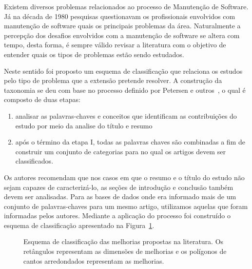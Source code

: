 Existem diversos problemas relacionados ao processo de Manutenção de Software.
Já na década de 1980 pesquisas questionavam os profissionais envolvidos com
manutenção de software quais os principais problemas da
área\cite{Lientz:1981:PAS:358790.358796}. Naturalmente a percepção dos desafios
envolvidos com a manutenção de software se altera com tempo, desta forma, é
sempre válido revisar a literatura com o objetivo de entender quais os tipos de
problemas estão sendo estudados.

Neste sentido foi proposto um esquema de classificação que relaciona os estudos
pelo tipo de problema que a extensão pretende resolver. A construção da
taxonomia se deu com base no processo definido por Petersen e
outros~\cite{Petersen2008}, o qual é composto de duas etapas:

\begin{enumerate}[I]
	\item analisar as palavras-chaves e conceitos que identificam as
		contribuições do estudo por meio da analise do título e resumo
	\item após o término da etapa I, todas as palavras chaves são combinadas a
		fim de construir um conjunto de categorias para no qual os artigos devem
		ser classificados.
\end{enumerate}

Os autores recomendam que nos casos em que o resumo e o título do estudo não
sejam capazes de caracterizá-lo, as seções de introdução e conclusão também
devem ser analisadas. Para as bases de dados onde era informado mais de um
conjunto de palavras-chaves para um mesmo artigo, utilizamos aquelas que foram
informadas pelos autores. Mediante a aplicação do processo foi construído o
esquema de classificação apresentado na
Figura~\ref{fig:diagrama-esquema-dimensao-melhorias}.

\begin{figure}[tb]
\centering
\caption{Esquema de classificação das melhorias propostas na literatura. Os
	retângulos representam as dimensões de melhorias e os polígonos de cantos
	arredondados representam as melhorias.}
\label{fig:diagrama-esquema-dimensao-melhorias}
\end{figure}


